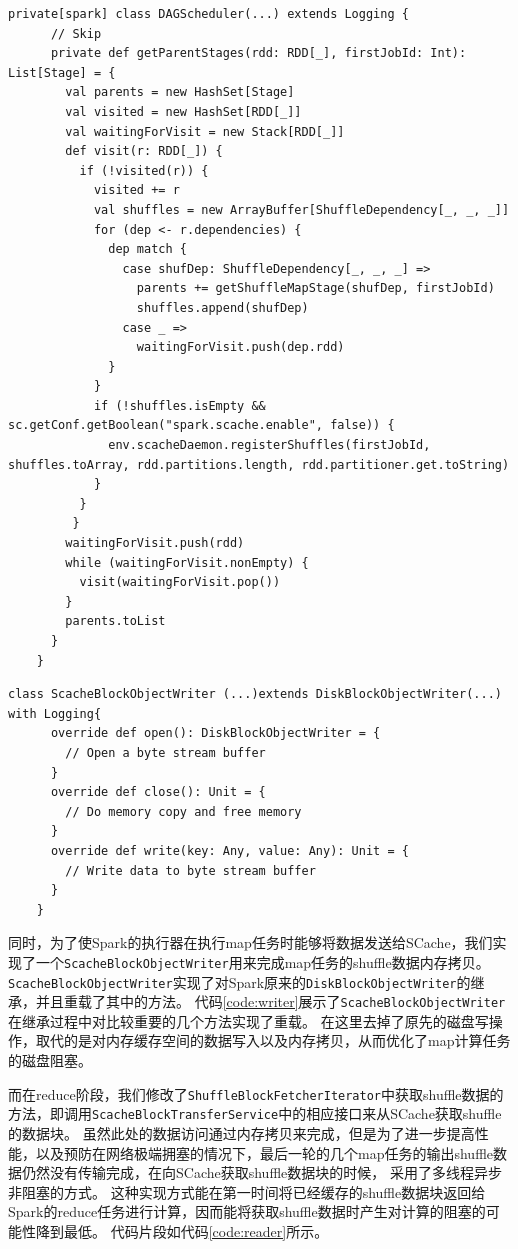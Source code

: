 \begin{lstlisting}[style={myScalastyle}, caption={DAGScheduler代码片段}, label={code:dagScheduler}]
    private[spark] class DAGScheduler(...) extends Logging {
      // Skip
      private def getParentStages(rdd: RDD[_], firstJobId: Int): List[Stage] = {
        val parents = new HashSet[Stage]
        val visited = new HashSet[RDD[_]]
        val waitingForVisit = new Stack[RDD[_]]
        def visit(r: RDD[_]) {
          if (!visited(r)) {
            visited += r
            val shuffles = new ArrayBuffer[ShuffleDependency[_, _, _]]
            for (dep <- r.dependencies) {
              dep match {
                case shufDep: ShuffleDependency[_, _, _] =>
                  parents += getShuffleMapStage(shufDep, firstJobId)
                  shuffles.append(shufDep)
                case _ =>
                  waitingForVisit.push(dep.rdd)
              }
            }
            if (!shuffles.isEmpty && sc.getConf.getBoolean("spark.scache.enable", false)) {
              env.scacheDaemon.registerShuffles(firstJobId, shuffles.toArray, rdd.partitions.length, rdd.partitioner.get.toString)
            }
          }
         }
        waitingForVisit.push(rdd)
        while (waitingForVisit.nonEmpty) {
          visit(waitingForVisit.pop())
        }
        parents.toList
      }
    }
\end{lstlisting}
\begin{lstlisting}[style={myScalastyle}, caption={ScacheBlockObjectWriter代码片段}, label={code:writer}]
    class ScacheBlockObjectWriter (...)extends DiskBlockObjectWriter(...) with Logging{
      override def open(): DiskBlockObjectWriter = {
        // Open a byte stream buffer
      }
      override def close(): Unit = {
        // Do memory copy and free memory
      }
      override def write(key: Any, value: Any): Unit = {
        // Write data to byte stream buffer
      }
    }
\end{lstlisting}
同时，为了使Spark的执行器在执行map任务时能够将数据发送给SCache，我们实现了一个\verb|ScacheBlockObjectWriter|用来完成map任务的shuffle数据内存拷贝。
\verb|ScacheBlockObjectWriter|实现了对Spark原来的\verb|DiskBlockObjectWriter|的继承，并且重载了其中的方法。
代码\ref{code:writer}展示了\verb|ScacheBlockObjectWriter|在继承过程中对比较重要的几个方法实现了重载。
在这里去掉了原先的磁盘写操作，取代的是对内存缓存空间的数据写入以及内存拷贝，从而优化了map计算任务的磁盘阻塞。

而在reduce阶段，我们修改了\verb|ShuffleBlockFetcherIterator|中获取shuffle数据的方法，即调用\verb|ScacheBlockTransferService|中的相应接口来从SCache获取shuffle的数据块。
虽然此处的数据访问通过内存拷贝来完成，但是为了进一步提高性能，以及预防在网络极端拥塞的情况下，最后一轮的几个map任务的输出shuffle数据仍然没有传输完成，在向SCache获取shuffle数据块的时候，
采用了多线程异步非阻塞的方式。
这种实现方式能在第一时间将已经缓存的shuffle数据块返回给Spark的reduce任务进行计算，因而能将获取shuffle数据时产生对计算的阻塞的可能性降到最低。
代码片段如代码\ref{code:reader}所示。

